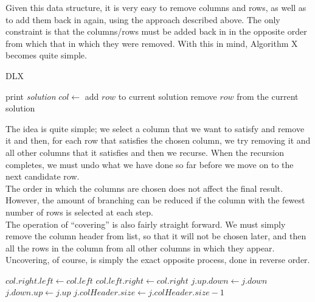 \documentclass[12pt]{article}
\newcounter{row}
\newcounter{col}
\begin{document}
Given this data structure, it is very easy to remove columns and rows, as well as to add them back in again, using the approach described above. The only constraint is that the columns/rows must be added back in in the opposite order from which that in which they were removed. With this in mind, Algorithm X becomes quite simple. \\ 
\begin{algorithm}[H]
\caption{DLX}\label{search}
\begin{algorithmic}[1]
\State print \textit{solution}
\State \Return
\EndIf
\State $col \gets$ 
\State {}
\State add $row$ to current solution
\State {}
\EndFor
\State {}
\State {}
\EndFor
\State remove $row$ from the current solution
\EndFor
\State {}
\EndProcedure
\end{algorithmic}
\end{algorithm}


The idea is quite simple; we select a column that we want to satisfy and remove it and then, for each row that satisfies the chosen column, we try removing it and all other columns that it satisfies and then we recurse. When the recursion completes, we must undo what we have done so far before we move on to the next candidate row. \\ 

The order in which the columns are chosen does not affect the final result. However, the amount of branching can be reduced if the column with the fewest number of rows is selected at each step. \\

The operation of ``covering'' is also fairly straight forward. We must simply remove the column header from list, so that it will not be chosen later, and then all the rows in the column from all other columns in which they appear. Uncovering, of course, is simply the exact opposite process, done in reverse order. \\

\begin{algorithm}[!ht]
\label{cover}
\begin{algorithmic}
\State $col.right.left \gets col.left$
\State $col.left.right \gets col.right$
\State $j.up.down \gets j.down$
\State $j.down.up \gets j.up$
\State $j.colHeader.size \gets j.colHeader.size - 1$
\EndFor
\EndFor
\EndProcedure
\end{algorithmic}
\end{algorithm}
\end{document}
